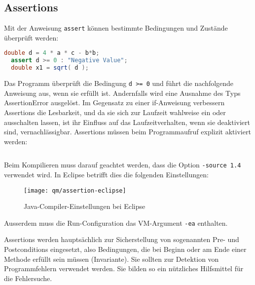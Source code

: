 \subsection{Assertions}
Mit der Anweisung \verb+assert+ können
bestimmte Bedingungen und Zustände überprüft werden:
\begin{lstlisting}[language=java, morekeywords={assert}]
  double d = 4 * a * c - b*b;
  assert d >= 0 : "Negative Value";
  double x1 = sqrt( d );
\end{lstlisting}
Das Programm überprüft die Bedingung \verb+d >= 0+ und führt die nachfolgende
Anweisung aus, wenn sie erfüllt ist. Andernfalls wird eine Ausnahme des Typs
AssertionError ausgelöst. Im Gegensatz zu einer if-Anweisung verbessern
Assertions  die Lesbarkeit, und da sie sich zur Laufzeit wahlweise ein
oder ausschalten lassen, ist ihr Einfluss auf das
 Laufzeitverhalten, wenn sie deaktiviert sind, vernachlässigbar.
\ifslides
\newpage
\fi
Assertions müssen beim Programmaufruf explizit aktiviert werden:
\begin{lstlisting}[language=csh]
% java -ea AssertionTest
\end{lstlisting}
Beim Kompilieren muss darauf geachtet werden, dass die Option
\verb+-source 1.4+ verwendet wird. In Eclipse betrifft dies
die folgenden Einstellungen:

\begin{figure}[H]
\centering
\texttt{[image: qm/assertion-eclipse]}
\caption{Java-Compiler-Einstellungen bei Eclipse}
\end{figure}
Ausserdem muss die Run-Configuration das VM-Argument \verb+-ea+ enthalten.

Assertions werden hauptsächlich zur Sicherstellung von sogenannten Pre- und
Postconditions eingesetzt, also Bedingungen, die bei Beginn oder am Ende einer
Methode erfüllt sein müssen (Invariante). Sie sollten zur Detektion von
Programmfehlern verwendet werden. Sie bilden so ein nützliches Hilfsmittel für
die Fehlersuche.
%
\newslide
